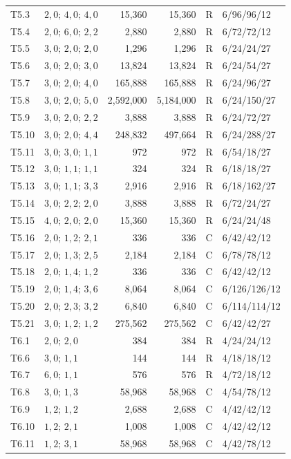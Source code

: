 \begin{longtable}{llrrcl}
T5.3 & $2,0;\,4,0;\,4,0$ & 15,360 & 15,360 & R & 6/96/96/12 \\
T5.4 & $2,0;\,6,0;\,2,2$ & 2,880 & 2,880 & R & 6/72/72/12 \\
T5.5 & $3,0;\,2,0;\,2,0$ & 1,296 & 1,296 & R & 6/24/24/27 \\
T5.6 & $3,0;\,2,0;\,3,0$ & 13,824 & 13,824 & R & 6/24/54/27 \\
T5.7 & $3,0;\,2,0;\,4,0$ & 165,888 & 165,888 & R & 6/24/96/27 \\
T5.8 & $3,0;\,2,0;\,5,0$ & 2,592,000 & 5,184,000 & R & 6/24/150/27 \\
T5.9 & $3,0;\,2,0;\,2,2$ & 3,888 & 3,888 & R & 6/24/72/27 \\
T5.10 & $3,0;\,2,0;\,4,4$ & 248,832 & 497,664 & R & 6/24/288/27 \\
T5.11 & $3,0;\,3,0;\,1,1$ & 972 & 972 & R & 6/54/18/27 \\
T5.12 & $3,0;\,1,1;\,1,1$ & 324 & 324 & R & 6/18/18/27 \\
T5.13 & $3,0;\,1,1;\,3,3$ & 2,916 & 2,916 & R & 6/18/162/27 \\
T5.14 & $3,0;\,2,2;\,2,0$ & 3,888 & 3,888 & R & 6/72/24/27 \\
T5.15 & $4,0;\,2,0;\,2,0$ & 15,360 & 15,360 & R & 6/24/24/48 \\
T5.16 & $2,0;\,1,2;\,2,1$ & 336 & 336 & C & 6/42/42/12 \\
T5.17 & $2,0;\,1,3;\,2,5$ & 2,184 & 2,184 & C & 6/78/78/12 \\
T5.18 & $2,0;\,1,4;\,1,2$ & 336 & 336 & C & 6/42/42/12 \\
T5.19 & $2,0;\,1,4;\,3,6$ & 8,064 & 8,064 & C & 6/126/126/12 \\
T5.20 & $2,0;\,2,3;\,3,2$ & 6,840 & 6,840 & C & 6/114/114/12 \\
T5.21 & $3,0;\,1,2;\,1,2$ & 275,562 & 275,562 & C & 6/42/42/27 \\
T6.1 & $2,0;\,2,0$ & 384 & 384 & R & 4/24/24/12 \\
T6.6 & $3,0;\,1,1$ & 144 & 144 & R & 4/18/18/12 \\
T6.7 & $6,0;\,1,1$ & 576 & 576 & R & 4/72/18/12 \\
T6.8 & $3,0;\,1,3$ & 58,968 & 58,968 & C & 4/54/78/12 \\
T6.9 & $1,2;\,1,2$ & 2,688 & 2,688 & C & 4/42/42/12 \\
T6.10 & $1,2;\,2,1$ & 1,008 & 1,008 & C & 4/42/42/12 \\
T6.11 & $1,2;\,3,1$ & 58,968 & 58,968 & C & 4/42/78/12 \\

\end{longtable}
